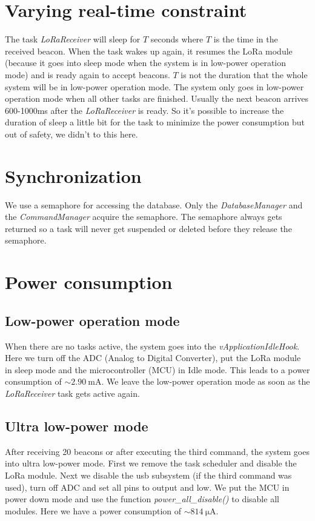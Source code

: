\documentclass{scrartcl}
\begin{document}
\section{Varying real-time constraint}
The task \textit{LoRaReceiver} will sleep for $T$ seconds where $T$ is the time in the received beacon.
When the task wakes up again, it resumes the LoRa module (because it goes into sleep mode when the system is in low-power operation mode)
and is ready again to accept beacons. $T$ is not the duration that the whole system will be in low-power operation mode.
The system only goes in low-power operation mode when all other tasks are finished.
Usually the next beacon arrives 600-1000ms after the \textit{LoRaReceiver} is ready. So it's possible to increase
the duration of sleep a little bit for the task to minimize the power consumption but out of safety, we didn't to this here.

\section{Synchronization}
We use a semaphore for accessing the database. Only the \textit{DatabaseManager} and the \textit{CommandManager} acquire the semaphore.
The semaphore always gets returned so a task will never get suspended or deleted before they release the semaphore.

\newpage

\section{Power consumption}
\subsection{Low-power operation mode}
When there are no tasks active, the system goes into the \textit{vApplicationIdleHook}.
Here we turn off the ADC (Analog to Digital Converter),
put the LoRa module in sleep mode and the microcontroller (MCU) in Idle mode.
This leads to a power consumption of $\sim \SI{2.90}{\milli\ampere}$.
We leave the low-power operation mode as soon as the \textit{LoRaReceiver} task gets active again.

\subsection{Ultra low-power mode}
After receiving 20 beacons or after executing the third command, the system goes into ultra low-power mode.
First we remove the task scheduler and disable the LoRa module.
Next we disable the usb subsystem (if the third command was used), turn off ADC and set all pins to output and low.
We put the MCU in power down mode and use the function \textit{power\_all\_disable()} to disable all modules.
Here we have a power consumption of $\sim \SI{814}{\micro\ampere}$.
\end{document}
